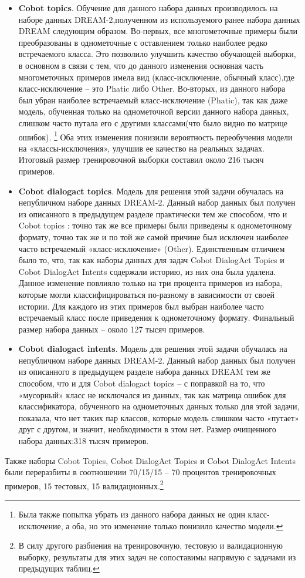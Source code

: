 \begin{itemize}
\item\textbf{Cobot topics}. Обучение для данного набора данных производилось на наборе данных DREAM-2,полученном из используемого ранее набора данных {DREAM} следующим образом.
Во-первых, все многометочные примеры были преобразованы в однометочные с оставлением только наиболее редко встречаемого класса. Это позволило улучшить качество обучающей выборки, в основном в связи с тем, что до данного изменения основная часть многометочных примеров имела вид (класс-исключение, обычный класс),где класс-исключение -- это Phatic либо Other. Во-вторых, из данного набора был убран наиболее встречаемый класс-исключение (Phatic), так как даже модель, обученная только на однометочной версии данного набора данных, слишком часто путала его с другими классами(что было видно по матрице ошибок). \footnote{Была также попытка убрать из данного набора данных не один класс-исключение, а оба, но это изменение только понизило качество модели.}
Оба этих изменения понизили вероятность переобучения модели на «классы-исключения», улучшив ее качество на реальных задачах. Итоговый размер тренировочной выборки составил около 216 тысяч примеров.
\item\textbf{Cobot dialogact topics}. Модель для решения этой задачи обучалась на непубличном наборе данных DREAM-2. Данный набор данных был получен из описанного в предыдущем разделе практически тем же способом, что и {Cobot topics} : точно так же все примеры были приведены к однометочному формату, точно так же и по той же самой причине был исключен наиболее часто встречаемый «класс-исключение» (Other).
 Единственным отличием было то, что, так как наборы данных для задач {Cobot DialogAct Topics} и {Cobot DialogAct Intents} содержали историю, из них она была удалена. Данное изменение повлияло только на три процента примеров из набора, которые могли классифицироваться по-разному в зависимости от своей истории. Для каждого из этих примеров был выбран наиболее часто встречаемый класс после приведения к однометочному формату. Финальный размер набора данных -- около 127 тысяч примеров.

\item\textbf{Cobot dialogact intents}. Модель для решения этой задачи обучалась на непубличном наборе данных DREAM-2. Данный набор данных был получен из описанного в предыдущем разделе набора данных {DREAM} тем же способом, что и для {Cobot dialogact topics} -- с поправкой на то, что «мусорный» класс не исключался из данных, так как матрица ошибок для классификатора, обученного на однометочных данных только для этой задачи, показала, что нет таких пар классов, которые модель слишком часто «путает» друг с другом, и значит, необходимости в этом нет. Размер очищенного набора данных:318 тысяч примеров.
\end{itemize}
Также наборы {Cobot Topics}, {Cobot DialogAct Topics} и {Cobot DialogAct Intents} были переразбиты в соотношении 70/15/15 -- 70 процентов тренировочных примеров, 15 тестовых, 15 валидационных.\footnote{В силу другого разбиения на тренировочную, тестовую и валидационную выборку, результаты для этих задач не сопоставимы напрямую с задачами из предыдущих таблиц.}

